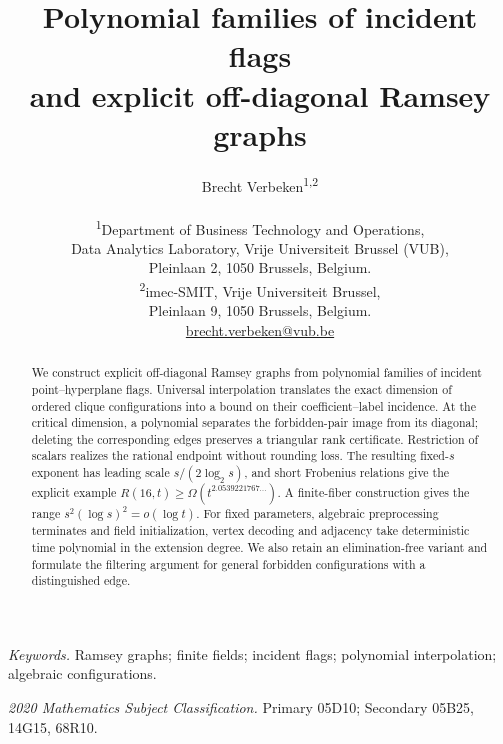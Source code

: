 \documentclass[11pt,a4paper]{article}
\theoremstyle{definition}
\theoremstyle{remark}
\numberwithin{equation}{section}
\begin{document}
\title{Polynomial families of incident flags\\and explicit off-diagonal Ramsey graphs}
\author{Brecht Verbeken\textsuperscript{1,2}\\[0.6em]
\parbox{0.96\textwidth}{\centering\small
\textsuperscript{1}Department of Business Technology and Operations,\\
Data Analytics Laboratory, Vrije Universiteit Brussel (VUB),\\
Pleinlaan 2, 1050 Brussels, Belgium.\\[0.35em]
\textsuperscript{2}imec-SMIT, Vrije Universiteit Brussel,\\
Pleinlaan 9, 1050 Brussels, Belgium.\\[0.45em]
\href{mailto:brecht.verbeken@vub.be}{brecht.verbeken@vub.be}}}
\date{}
\maketitle

\begin{abstract}
We construct explicit off-diagonal Ramsey graphs from polynomial families of incident point--hyperplane flags. Universal interpolation translates the exact dimension of ordered clique configurations into a bound on their coefficient--label incidence. At the critical dimension, a polynomial separates the forbidden-pair image from its diagonal; deleting the corresponding edges preserves a triangular rank certificate. Restriction of scalars realizes the rational endpoint without rounding loss. The resulting fixed-$s$ exponent has leading scale $s/(2\log_2s)$, and short Frobenius relations give the explicit example $R(16,t)\ge\Omega(t^{2.0539221767\ldots})$. A finite-fiber construction gives the range $s^2(\log s)^2=o(\log t)$. For fixed parameters, algebraic preprocessing terminates and field initialization, vertex decoding and adjacency take deterministic time polynomial in the extension degree. We also retain an elimination-free variant and formulate the filtering argument for general forbidden configurations with a distinguished edge.
\end{abstract}

\noindent\textit{Keywords.} Ramsey graphs; finite fields; incident flags; polynomial interpolation; algebraic configurations.\par
\noindent\textit{2020 Mathematics Subject Classification.} Primary 05D10; Secondary 05B25, 14G15, 68R10.
\end{document}
